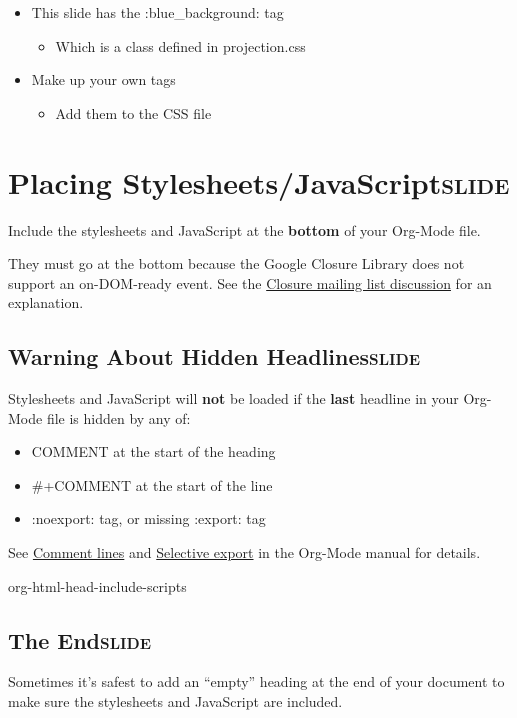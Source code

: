 \documentclass[11pt]{article}
\begin{document}
\begin{itemize}
\item This slide has the :blue_background: tag
\begin{itemize}
\item Which is a class defined in projection.css
\end{itemize}
\item Make up your own tags
\begin{itemize}
\item Add them to the CSS file
\end{itemize}
\end{itemize}

\section{Placing Stylesheets/JavaScript\hfill{}\textsc{slide}}
\label{sec:orgheadline72}

Include the stylesheets and JavaScript at the \textbf{bottom} of your Org-Mode file.

They must go at the bottom because the Google Closure Library does not support an on-DOM-ready event. See the \href{http://groups.google.com/group/closure-library-discuss/browse_thread/thread/1beecbb5d6afcb41/075c536259653946}{Closure mailing list discussion} for an explanation.

\subsection{Warning About Hidden Headlines\hfill{}\textsc{slide}}
\label{sec:orgheadline70}

Stylesheets and JavaScript will \textbf{not} be loaded if the \textbf{last} headline in your Org-Mode file is hidden by any of:

\begin{itemize}
\item COMMENT at the start of the heading
\item #+COMMENT at the start of the line
\item :noexport: tag, or missing :export: tag
\end{itemize}

See \href{http://orgmode.org/manual/Comment-lines.html}{Comment lines} and \href{http://orgmode.org/manual/Selective-export.html}{Selective export} in the Org-Mode manual for details.

org-html-head-include-scripts

\subsection{The End\hfill{}\textsc{slide}}
\label{sec:orgheadline71}

Sometimes it's safest to add an ``empty'' heading at the end of your document to make sure the stylesheets and JavaScript are included.
\end{document}
